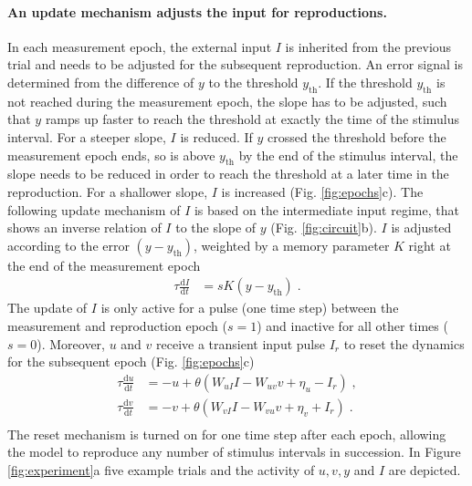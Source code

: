 \documentclass[10pt]{article}
\begin{document}
\paragraph{An update mechanism adjusts the input for reproductions.}
In each measurement epoch, the external input $I$ is inherited from the previous trial and needs to be adjusted for the subsequent reproduction. 
An error signal is determined from the difference of $y$ to the threshold $y_{\text{th}}$.
If the threshold $y_{\text{th}}$ is not reached during the measurement epoch, the slope has to be adjusted, such that $y$ ramps up faster to reach the threshold at exactly the time of the stimulus interval. For a steeper slope, $I$ is reduced.
If $y$ crossed the threshold before the measurement epoch ends, so is above $y_{\text{th}}$ by the end of the stimulus interval, the slope needs to be reduced in order to reach the threshold at a later time in the reproduction. For a shallower slope, $I$ is increased (Fig. \ref{fig:epochs}c).
The following update mechanism of $I$ is based on the intermediate input regime, that shows an inverse relation of $I$ to the slope of $y$ (Fig. \ref{fig:circuit}b).
$I$ is adjusted according to the error $(y-y_{\text{th}})$, weighted by a memory parameter $K$ right at the end of the measurement epoch
\begin{equation} \label{Iupdate}
	\begin{split}
	\tau\frac{\text{d}I}{\text{d}t} & = sK(y-y_{\text{th}}) \;.
	\end{split}
\end{equation}
The update of $I$ is only active for a pulse (one time step) between the measurement and reproduction epoch ($s=1$) and inactive for all other times ($s=0$).
Moreover, $u$ and $v$ receive a transient input pulse $I_r$ to reset the dynamics for the subsequent epoch (Fig. \ref{fig:epochs}c)
\begin{equation} \label{experimentcircuit}
	\begin{split}
	\tau\frac{\text{d}u}{\text{d}t} & = -u + \theta(W_{uI}I - W_{uv}v + \eta_u - I_r) \;,\\
	\tau\frac{\text{d}v}{\text{d}t} & = -v + \theta(W_{vI}I - W_{vu}v + \eta_v + I_r) \;.\\
	\end{split}
\end{equation}
The reset mechanism is turned on for one time step after each epoch, allowing the model to reproduce any number of stimulus intervals in succession.
In Figure \ref{fig:experiment}a five example trials and the activity of $u, v, y$ and $I$ are depicted. 
\end{document}
